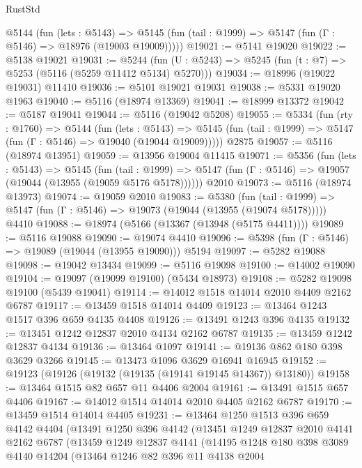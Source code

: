 \begin{lexlean}{RustStd}
\begin{coremodule}
    @5144
      (fun (lets : @5143) =>
      @5145 (fun (tail : @1999) => @5147 (fun (Γ : @5146) => @18976 (@19003 @19009)))))
@19021 := @5141 @19020
@19022 := @5138 @19021
@19031 := @5244
    (fun (U : @5243) => @5245 (fun (t : @7) => @5253 (@5116 (@5259 @11412 @5134) @5270)))
@19034 := @18996 (@19022 @19031) @11410
@19036 := @5101 @19021 @19031
@19038 := @5331 @19020 @1963
@19040 := @5116 (@18974 @13369)
@19041 := @18999 @13372
@19042 := @5187 @19041
@19044 := @5116 (@19042 @5208)
@19055 := @5334
    (fun (rty : @1760) =>
    @5144
      (fun (lets : @5143) =>
      @5145 (fun (tail : @1999) => @5147 (fun (Γ : @5146) => @19040 (@19044 @19009)))))
    @2875
@19057 := @5116 (@18974 @13951)
@19059 := @13956 @19004 @11415
@19071 := @5356
    (fun (lets : @5143) =>
    @5145
      (fun (tail : @1999) =>
      @5147 (fun (Γ : @5146) => @19057 (@19044 (@13955 (@19059 @5176 @5178))))))
    @2010
@19073 := @5116 (@18974 @13973)
@19074 := @19059 @2010
@19083 := @5380
    (fun (tail : @1999) => @5147 (fun (Γ : @5146) => @19073 (@19044 (@13955 (@19074 @5178)))))
    @4410
@19088 := @18974 (@5166 (@13367 (@13948 (@5175 @4411))))
@19089 := @5116 @19088
@19090 := @19074 @4410
@19096 := @5398 (fun (Γ : @5146) => @19089 (@19044 (@13955 @19090))) @5194
@19097 := @5282 @19088
@19098 := @19042 @13434
@19099 := @5116 @19098
@19100 := @14002 @19090
@19104 := @19097 (@19099 @19100) (@5434 @18973)
@19108 := @5282 @19098 @19100 (@5439 @19041)
@19114 := @14012 @1518 @14014 @2010 @4409 @2162 @6787
@19117 := @13459 @1518 @14014 @4409
@19123 := @13464 @1243 @1517 @396 @659 @4135 @4408
@19126 := @13491 @1243 @396 @4135
@19132 := @13451 @1242 @12837 @2010 @4134 @2162 @6787
@19135 := @13459 @1242 @12837 @4134
@19136 := @13464 @1097
@19141 := @19136 @862 @180 @398 @3629 @3266
@19145 := @13473 @1096 @3629 @16941 @16945
@19152 := @19123 (@19126 (@19132 (@19135 (@19141 @19145 @14367)) @13180))
@19158 := @13464 @1515 @82 @657 @11 @4406 @2004
@19161 := @13491 @1515 @657 @4406
@19167 := @14012 @1514 @14014 @2010 @4405 @2162 @6787
@19170 := @13459 @1514 @14014 @4405
@19231 := @13464
    @1250
    @1513
    @396
    @659
    @4142
    @4404
    (@13491
      @1250
      @396
      @4142
      (@13451
        @1249
        @12837
        @2010
        @4141
        @2162
        @6787
        (@13459
          @1249
          @12837
          @4141
          (@14195
            @1248
            @180
            @398
            @3089
            @4140
            @14204
            (@13464
              @1246
              @82
              @396
              @11
              @4138
              @2004

\end{coremodule}
\end{lexlean}
